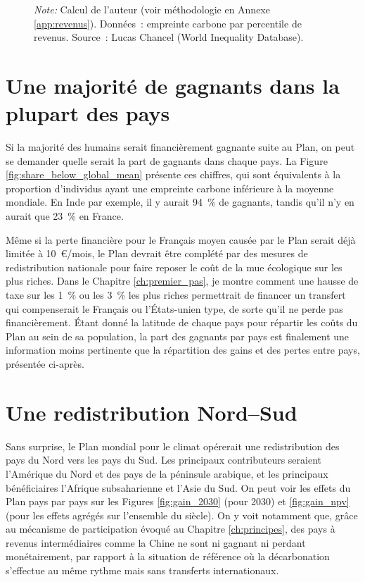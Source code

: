 \documentclass[a5paper,french,openany]{memoir}
\begin{document}
\begin{figure}[h!]
\begin{subfigure}{.5\textwidth}
\end{subfigure}
{\footnotesize \textit{Note:} Calcul de l'auteur %
(voir méthodologie en Annexe \ref{app:revenus}). Données~: empreinte carbone par percentile de revenus. Source~: Lucas Chancel (World Inequality Database).}
\end{figure}

\section{Une majorité de gagnants dans la plupart des pays}

Si la majorité des humains serait financièrement gagnante suite au Plan, on peut se demander quelle serait la part de gagnants dans chaque pays. La Figure \ref{fig:share_below_global_mean} présente ces chiffres, qui sont équivalents à la proportion d'individus ayant une empreinte carbone inférieure à la moyenne mondiale. En Inde par exemple, il y aurait 94~\% de gagnants, tandis qu'il n'y en aurait que 23~\% en France.  

Même si la perte financière pour le Français moyen causée par le Plan serait déjà limitée à 10~\euro{}/mois, le Plan devrait être complété par des mesures de redistribution nationale pour faire reposer le coût de la mue écologique sur les plus riches. Dans le Chapitre \ref{ch:premier_pas}, je montre comment une hausse de taxe sur les 1~\% ou les 3~\% les plus riches permettrait de financer un transfert qui compenserait le Français ou l'États-unien type, de sorte qu'il ne perde pas financièrement. Étant donné la latitude de chaque pays pour répartir les coûts du Plan au sein de sa population, la part des gagnants par pays est finalement une information moins pertinente que la répartition des gains et des pertes entre pays, présentée ci-après.


\section{Une redistribution Nord--Sud}

Sans surprise, le Plan mondial pour le climat opérerait une redistribution des pays du Nord vers les pays du Sud. Les principaux contributeurs seraient l'Amérique du Nord et des pays de la péninsule arabique, et les principaux bénéficiaires l'Afrique subsaharienne et l'Asie du Sud. On peut voir les effets du Plan pays par pays sur les Figures \ref{fig:gain_2030} (pour 2030) et \ref{fig:gain_npv} (pour les effets agrégés sur l'ensemble du siècle). On y voit notamment que, grâce au mécanisme de participation évoqué au Chapitre \ref{ch:principes}, des pays à revenus intermédiaires comme la Chine ne sont ni gagnant ni perdant monétairement, par rapport à la situation de référence où la décarbonation s'effectue au même rythme mais sans transferts internationaux. 
\end{document}
